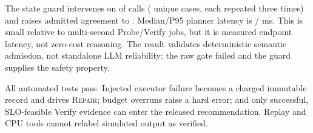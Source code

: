 The state guard intervenes on \PlannerInterventions{} of
\PlannerCallsPerSet{} calls (\PlannerUniqueInterventions{} unique cases, each
repeated three times) and raises admitted agreement to \PlannerVtwoAdmitted{}.
Median/P95 planner latency is
\PlannerVtwoMedianLatency{}/\PlannerVtwoPninetyfiveLatency{} ms.  This is small
relative to multi-second Probe/Verify jobs, but it is measured endpoint latency,
not zero-cost reasoning.  The result validates deterministic semantic admission,
not standalone LLM reliability: the raw gate failed and the guard supplies the
safety property.

All \AutomatedTests{} automated tests pass.  Injected executor failure becomes
a charged immutable record and drives \textsc{Repair}; budget overruns raise a
hard error; and only successful, SLO-feasible Verify evidence can enter the
released recommendation.  Replay and CPU tools cannot relabel simulated output
as verified.
